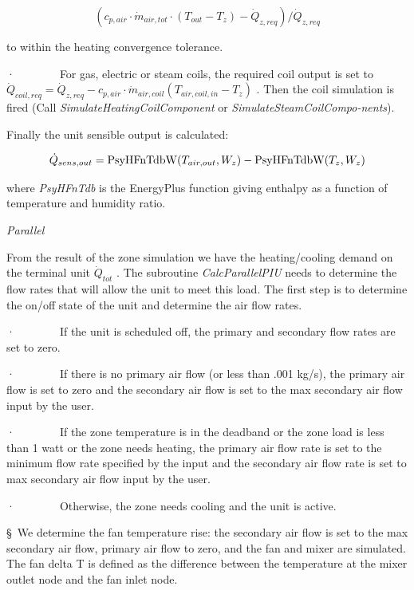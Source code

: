 \begin{equation}
({c_{p,air}}\cdot {\dot m_{air,tot}}\cdot ({T_{out}} - {T_z}) - {\dot Q_{z,req}})/{\dot Q_{z,req}}
\end{equation}

to within the heating convergence tolerance.

·~~~~~~~~For gas, electric or steam coils, the required coil output is set to \({\dot Q_{coil,req}} = {\dot Q_{z,req}} - {c_{p,air}}\cdot {\dot m_{air,coil}}({T_{air,coil,in}} - {T_z})\) . Then the coil simulation is fired (Call \emph{SimulateHeatingCoilComponent} or \emph{SimulateSteamCoilCompo-nents}).

Finally the unit sensible output is calculated:

\begin{equation}
{\dot Q_{sens,out}} = {\rm{PsyHFnTdbW}}({T_{air,out}},{W_z}) - {\rm{PsyHFnTdbW(}}{T_z},{W_z})
\end{equation}

where \emph{PsyHFnTdb} is the EnergyPlus function giving enthalpy as a function of temperature and humidity ratio.

\emph{Parallel}

From the result of the zone simulation we have the heating/cooling demand on the terminal unit \({\dot Q_{tot}}\) . The subroutine \emph{CalcParallelPIU} needs to determine the flow rates that will allow the unit to meet this load. The first step is to determine the on/off state of the unit and determine the air flow rates.

·~~~~~~~~If the unit is scheduled off, the primary and secondary flow rates are set to zero.

·~~~~~~~~If there is no primary air flow (or less than .001 kg/s), the primary air flow is set to zero and the secondary air flow is set to the max secondary air flow input by the user.

·~~~~~~~~If the zone temperature is in the deadband or the zone load is less than 1 watt or the zone needs heating, the primary air flow rate is set to the minimum flow rate specified by the input and the secondary air flow rate is set to max secondary air flow input by the user.

·~~~~~~~~Otherwise, the zone needs cooling and the unit is active.

§~We determine the fan temperature rise: the secondary air flow is set to the max secondary air flow, primary air flow to zero, and the fan and mixer are simulated. The fan delta T is defined as the difference between the temperature at the mixer outlet node and the fan inlet node.

